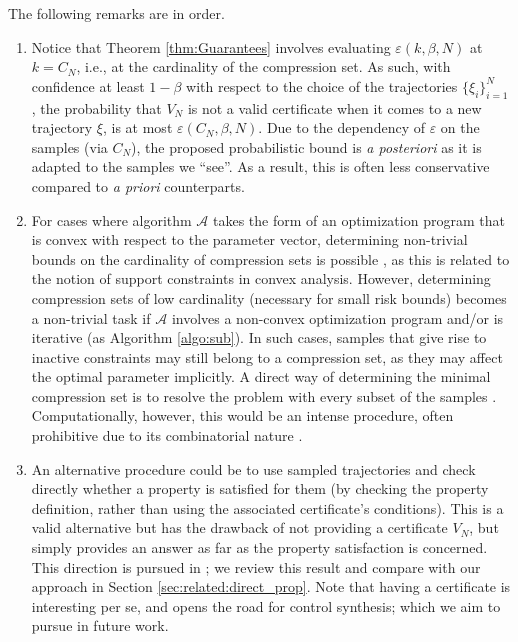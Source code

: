 The following remarks are in order.
\begin{enumerate}[wide, labelwidth=!, labelindent=0pt]
	\item Notice that Theorem \eqref{thm:Guarantees} involves evaluating $\varepsilon(k,\beta,N)$ at $k=C_N$, i.e., at the cardinality of the compression set. As such, with confidence at least $1-\beta$ with respect to the choice of the trajectories $\{\xi_i\}_{i=1}^N$, the probability that $V_N$ is not a valid certificate when it comes to a new trajectory $\xi$, is at most $\varepsilon(C_N,\beta,N)$. Due to the dependency of $\varepsilon$ on the samples (via $C_N$), the proposed  probabilistic bound is \emph{a posteriori} as it is adapted to the samples we ``see''. As a result, this is often less conservative compared to \emph{a priori} counterparts.
    \item  
    For cases where algorithm $\mathcal{A}$ takes the form of an optimization program that is convex with respect to the parameter vector, determining non-trivial bounds on the cardinality of compression sets is possible \cite{DBLP:journals/siamjo/CampiG08,DBLP:journals/tac/MargellosPL15}, as this is related to the notion of support constraints in convex analysis.
    However, determining compression sets of low cardinality (necessary for small risk bounds) becomes a non-trivial task if $\mathcal{A}$ involves a non-convex optimization program and/or is iterative (as Algorithm \ref{algo:sub}). 
    In such cases, samples that give rise to inactive constraints may still belong to a compression set, as they may affect the optimal parameter implicitly. 
    A direct way of determining the minimal compression set is to resolve the problem with every subset of the samples \cite{DBLP:journals/mp/CampiG18,DBLP:journals/tac/CampiGR18}. 
    Computationally, however, this would be an intense procedure, often prohibitive due to its combinatorial nature \cite{DBLP:journals/tac/FeleM21}. 
\item An alternative procedure could be to use sampled trajectories and check directly whether a property is satisfied for them (by checking the property definition, rather than using the associated certificate's conditions). 
	This is a valid alternative but has the drawback of not providing a certificate $V_N$, but simply provides an answer as far as the property satisfaction is concerned.
    This direction is pursued in \cite{DBLP:journals/sttt/BadingsCJJKT22}; we review this result and compare with our approach in Section \ref{sec:related:direct_prop}. Note that
	having a certificate is interesting per se, and opens the road for control synthesis; which we aim to pursue in future work. 
\end{enumerate}